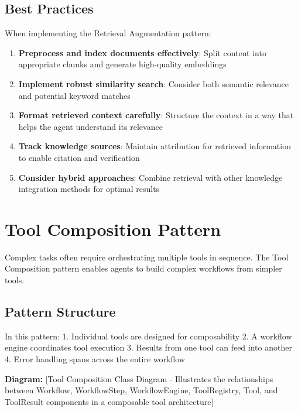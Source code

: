 \documentclass[11pt,oneside]{book}
\providecommand{\tightlist}{%
  \setlength{\itemsep}{0pt}\setlength{\parskip}{0pt}}
\begin{document}
\subsection{Best Practices}\label{best-practices-3}

When implementing the Retrieval Augmentation pattern:

\begin{enumerate}
\def\labelenumi{\arabic{enumi}.}
\tightlist
\item
  \textbf{Preprocess and index documents effectively}: Split content
  into appropriate chunks and generate high-quality embeddings
\item
  \textbf{Implement robust similarity search}: Consider both semantic
  relevance and potential keyword matches
\item
  \textbf{Format retrieved context carefully}: Structure the context in
  a way that helps the agent understand its relevance
\item
  \textbf{Track knowledge sources}: Maintain attribution for retrieved
  information to enable citation and verification
\item
  \textbf{Consider hybrid approaches}: Combine retrieval with other
  knowledge integration methods for optimal results
\end{enumerate}

\section{Tool Composition Pattern}\label{tool-composition-pattern}

Complex tasks often require orchestrating multiple tools in sequence.
The Tool Composition pattern enables agents to build complex workflows
from simpler tools.

\subsection{Pattern Structure}\label{pattern-structure-4}

In this pattern: 1. Individual tools are designed for composability 2. A
workflow engine coordinates tool execution 3. Results from one tool can
feed into another 4. Error handling spans across the entire workflow

\textbf{Diagram:} {[}Tool Composition Class Diagram - Illustrates the
relationships between Workflow, WorkflowStep, WorkflowEngine,
ToolRegistry, Tool, and ToolResult components in a composable tool
architecture{]}
\end{document}
